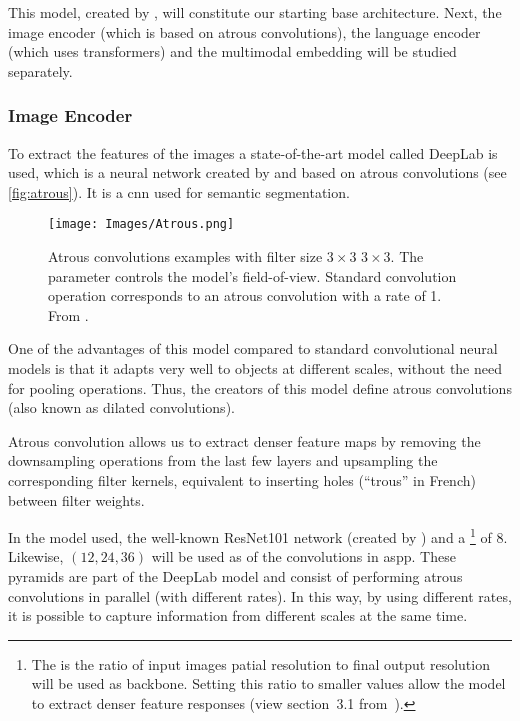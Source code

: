 This model, created by , will constitute our starting
base architecture. Next, the image encoder (which is based on atrous
convolutions), the language encoder (which uses transformers) and the
multimodal embedding will be studied separately.

\subsubsection{Image Encoder}

To extract the features of the images a state-of-the-art model called DeepLab
is used, which is a neural network created by  and based
on atrous convolutions (see \vref{fig:atrous}). It is a \gls{cnn} used for
semantic segmentation.

\begin{figure}[ht]
  \centering
  \texttt{[image: Images/Atrous.png]}
  \caption[Atrous convolutions examples]{Atrous convolutions examples with
    filter size \(3 \times 3\) \(3 \times 3\). The  parameter
    controls the model's field-of-view. Standard convolution operation
    corresponds to an atrous convolution with a rate of 1. From
    .}\label{fig:atrous}
\end{figure}

One of the advantages of this model compared to standard convolutional neural
models is that it adapts very well to objects at different scales, without the
need for pooling operations. Thus, the creators of this model define atrous
convolutions (also known as dilated convolutions).

\begin{quoteBox}
  Atrous convolution allows us to extract denser feature maps by removing the
  downsampling operations from the last few layers and upsampling the
  corresponding filter kernels, equivalent to inserting holes (``trous'' in
  French) between filter weights.
  \tcblower{}
\end{quoteBox}

In the model used, the well-known ResNet101 network (created by
) and a \footnote{The
   is the ratio of input images patial resolution to final
  output resolution will be used as backbone. Setting this ratio to smaller
  values allow the model to extract denser feature responses (view section~3.1
  from~\cite{chen17:rethin}).} of 8. Likewise, \((12, 24, 36)\) will be used as
 of the convolutions in \gls{aspp}. These pyramids are part of the
DeepLab model and consist of performing atrous convolutions in parallel (with
different rates). In this way, by using different rates, it is possible to
capture information from different scales at the same time.

